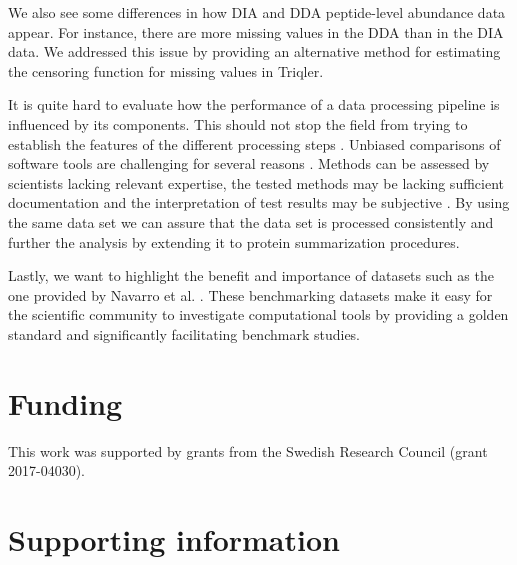 \documentclass[10pt,letterpaper]{article}
\begin{document}
We also see some differences in how DIA and DDA peptide-level abundance data appear. For instance, there are more missing values in the DDA than in the DIA data. We addressed this issue by providing an alternative method for estimating the censoring function for missing values in Triqler.

It is quite hard to evaluate how the performance of a data processing pipeline is influenced by its components. This should not stop the field from trying to establish the features of the different processing steps \cite{dufresne2014abrf,gatto2016testing,navarro2016multicenter}. Unbiased comparisons of software tools are challenging for several reasons \cite{dufresne2014abrf}. Methods can be assessed by scientists lacking relevant expertise, the tested methods may be lacking sufficient documentation and the interpretation of test results may be subjective \cite{yates2012toward,leprevost2014best,pak2013clustering,faircomparison2015}. By using the same data set we can assure that the data set is processed consistently and further the analysis by extending it to protein summarization procedures.

Lastly, we want to highlight the benefit and importance of datasets such as the one provided by Navarro et al. \cite{navarro2016multicenter}. These benchmarking datasets make it easy for the scientific community to investigate computational tools by providing a golden standard and significantly facilitating benchmark studies. 

\section*{Funding}

This work was supported by grants from the Swedish Research Council (grant 2017-04030).

\section*{Supporting information}


%

\end{document}
